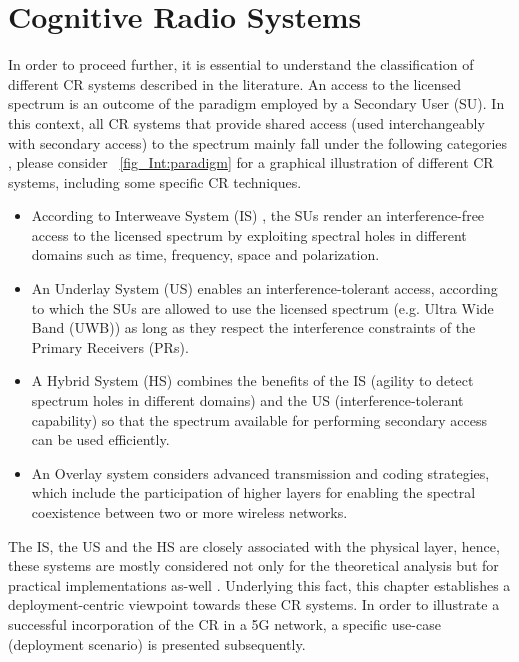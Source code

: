 \section{Cognitive Radio Systems }
\label{sec:CS}
In order to proceed further, it is essential to understand the classification of different CR systems described in the literature. An access to the licensed spectrum is an outcome of the paradigm employed by a Secondary User (SU). In this context, all CR systems that provide shared access (used interchangeably with secondary access) to the spectrum mainly fall under the following categories \cite{Goldsmith09}, please consider \figurename~\ref{fig_Int:paradigm} for a graphical illustration of different CR systems, including some specific CR techniques. 
\begin{itemize}
\item According to Interweave System (IS) , the SUs render an interference-free access to the licensed spectrum by exploiting spectral holes in different domains such as time, frequency, space and polarization.
\item An Underlay System (US)  enables an interference-tolerant access, according to which the SUs are allowed to use the licensed spectrum (e.g. Ultra Wide Band (UWB)) as long as they respect the interference constraints of the Primary Receivers (PRs).
\item A Hybrid System (HS)  combines the benefits of the IS (agility to detect spectrum holes in different domains) and the US (interference-tolerant capability) so that the spectrum available for performing secondary access can be used efficiently.
\item An Overlay system  considers advanced transmission and coding strategies, which include the participation of higher layers for enabling the spectral coexistence between two or more wireless networks.
\end{itemize}
The IS, the US and the HS are closely associated with the physical layer, hence, these systems are mostly considered not only for the theoretical analysis but for practical implementations as-well \cite{Kaushik13, Kaushik14_CC, Kaushik15_D, Kaushik16_CC, Kaushik16_VTC2, Cabric04, Cabric06, Kim10}. 
Underlying this fact, this chapter establishes a deployment-centric viewpoint towards these CR systems. In order to illustrate a successful incorporation of the CR in a 5G network, a specific use-case (deployment scenario) is presented subsequently.


